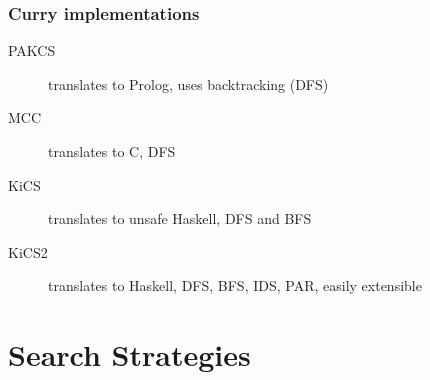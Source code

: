 \documentclass[
,hyperref={pdfpagelabels=false}
]{beamer}
\begin{document}
\begin{frame}[fragile]%
\frametitle{Curry implementations} %
\begin{description}
\item[PAKCS] translates to Prolog, uses backtracking (DFS)
\item[MCC]   translates to C, DFS
\item[KiCS]  translates to unsafe Haskell, DFS and BFS
\item[KiCS2] translates to Haskell, DFS, BFS, IDS, PAR, easily extensible
\end{description}
\end{frame}

\section{Search Strategies}
\end{document}
